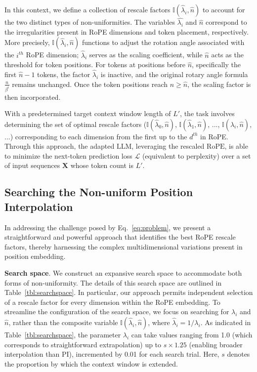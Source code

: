 In this context, we define a collection of rescale factors $\mathbb{I}(\hat{\lambda}_{i},\hat{n})$ to account for the two distinct types of non-uniformities. The variables $\hat{\lambda_i}$ and $\hat{n}$ correspond to the irregularities present in RoPE dimensions and token placement, respectively. More precisely, $\mathbb{I}(\hat{\lambda}_{i},\hat{n})$ functions to adjust the rotation angle associated with the $i^{th}$ RoPE dimension; $\hat\lambda_{i}$ serves as the scaling coefficient, while $\hat{n}$ acts as the threshold for token positions. For tokens at positions before $\hat{n}$, specifically the first $\hat{n}-1$ tokens, the factor $\hat\lambda_{i}$ is inactive, and the original rotary angle formula $\frac{n}{\beta^i}$ remains unchanged. Once the token positions reach $n \geq \hat{n}$, the scaling factor is then incorporated.

With a predetermined target context window length of $L'$, the task involves determining the set of optimal rescale factors ($\mathbb{I}(\hat{\lambda}_{0},\hat{n})$, $\mathbb{I}(\hat{\lambda}_{1},\hat{n})$, ..., $\mathbb{I}(\hat{\lambda}_{i},\hat{n})$, ...) corresponding to each dimension from the first up to the $d^{th}$ in RoPE. Through this approach, the adapted $\text{LLM}$, leveraging the rescaled $\text{RoPE}$, is able to minimize the next-token prediction loss $\mathcal{L}$ (equivalent to perplexity) over a set of input sequences $\mathbf{X}$ whose token count is $L'$.

\subsection{Searching the Non-uniform Position Interpolation}

In addressing the challenge posed by Eq.~\ref{eq:problem}, we present a straightforward and powerful approach that identifies the best RoPE rescale factors, thereby harnessing the complex multidimensional variations present in position embedding.

\textbf{Search space}. We construct an expansive search space to accommodate both forms of non-uniformity. The details of this search space are outlined in Table~\ref{tbl:searchspace}. In particular, our approach permits independent selection of a rescale factor for every dimension within the RoPE embedding. To streamline the configuration of the search space, we focus on searching for $\lambda_i$ and $\hat{n}$, rather than the composite variable $\mathbb{I}(\hat{\lambda}_{i},\hat{n})$, where  $\hat{\lambda}_{i}=1/\lambda_i$. 
As indicated in Table~\ref{tbl:searchspace}, the parameter $\lambda_i$ can take values ranging from 1.0 (which corresponds to straightforward extrapolation) up to $s\times1.25$ (enabling broader interpolation than PI), incremented by 0.01 for each search trial. Here, $s$ denotes the proportion by which the context window is extended.

